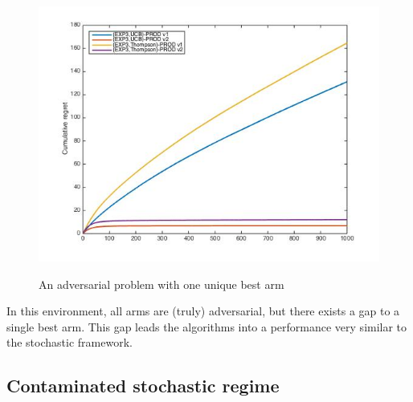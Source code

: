 \documentclass[10.5pt]{article}
\begin{document}
\begin{figure}[H]
  \label{fig:awesome_image2}
\endminipage\hfill
{}%
  \includegraphics[width=\linewidth]{Adv2_prod.jpg}
  \label{fig:awesome_image3}
\endminipage
\caption{An adversarial problem with one unique best arm}
\end{figure}

In this environment, all arms are (truly) adversarial, but there exists a gap to a single best arm. This gap leads the algorithms into a performance very similar to the stochastic framework.

\subsection*{Contaminated stochastic regime}
\end{document}
